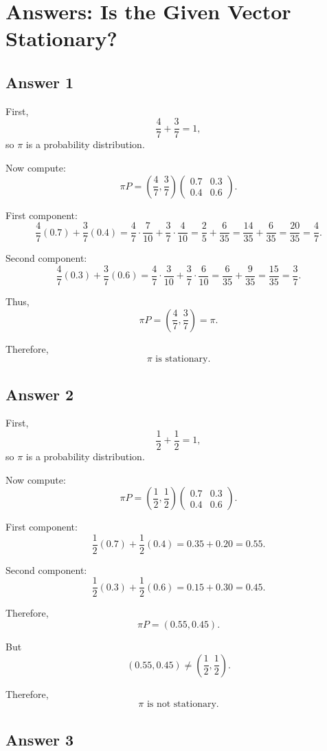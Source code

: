 \documentclass[12pt,a4paper]{article}
\theoremstyle{notestyle}
\begin{document}
\section{Answers: Is the Given Vector Stationary?}

\subsection*{Answer 1}

First,
\[
\frac47+\frac37=1,
\]
so $\pi$ is a probability distribution.

Now compute:
\[
\pi P
=
\left(\frac47,\frac37\right)
\begin{pmatrix}
0.7 & 0.3\\
0.4 & 0.6
\end{pmatrix}.
\]

First component:
\[
\frac47(0.7)+\frac37(0.4)
=
\frac47\cdot\frac7{10}+\frac37\cdot\frac4{10}
=
\frac25+\frac6{35}
=
\frac{14}{35}+\frac6{35}
=
\frac{20}{35}
=
\frac47.
\]

Second component:
\[
\frac47(0.3)+\frac37(0.6)
=
\frac47\cdot\frac3{10}+\frac37\cdot\frac6{10}
=
\frac6{35}+\frac9{35}
=
\frac{15}{35}
=
\frac37.
\]

Thus,
\[
\pi P=\left(\frac47,\frac37\right)=\pi.
\]

Therefore,
\[
\boxed{\pi\text{ is stationary.}}
\]

\subsection*{Answer 2}

First,
\[
\frac12+\frac12=1,
\]
so $\pi$ is a probability distribution.

Now compute:
\[
\pi P
=
\left(\frac12,\frac12\right)
\begin{pmatrix}
0.7 & 0.3\\
0.4 & 0.6
\end{pmatrix}.
\]

First component:
\[
\frac12(0.7)+\frac12(0.4)
=0.35+0.20
=0.55.
\]

Second component:
\[
\frac12(0.3)+\frac12(0.6)
=0.15+0.30
=0.45.
\]

Therefore,
\[
\pi P=(0.55,0.45).
\]

But
\[
(0.55,0.45)\neq \left(\frac12,\frac12\right).
\]

Therefore,
\[
\boxed{\pi\text{ is not stationary.}}
\]

\subsection*{Answer 3}
\end{document}
